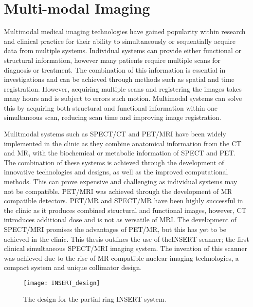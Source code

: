 \section{Multi-modal Imaging} %
Multimodal medical imaging technologies have gained popularity within research and clinical practice for their ability to simultaneously or sequentially acquire data from multiple systems. Individual systems can provide either functional or structural information, however many patients require multiple scans for diagnosis or treatment. The combination of this information is essential in investigations and can be achieved through methods such as spatial and time registration. However, acquiring multiple scans and registering the images takes many hours and is subject to errors such motion. Multimodal systems can solve this by acquiring both structural and functional information within one simultaneous scan, reducing scan time and improving image registration. 

Mulitmodal systems such as \acrlong{SPECT/CT} and \acrlong{PET/MRI} have been widely implemented in the clinic as they combine anatomical information from the \acrshort{CT} and \acrshort{MR}, with the biochemical or metabolic information of \acrshort{SPECT} and \acrshort{PET}. The combination of these systems is achieved through the development of innovative technologies and designs, as well as the improved computational methods. This can prove expensive and challenging as individual systems may not be compatible. \acrshort{PET/MRI} was achieved through the development of \acrshort{MR} compatible detectors. \acrshort{PET/MR} and \acrshort{SPECT/MR} have been highly successful in the clinic as it produces combined structural and functional images, however, \acrshort{CT} introduces additional dose and is not as versatile of \acrshort{MRI}. The development of \acrshort{SPECT/MRI} promises the advantages of \acrshort{PET/MR}, but this has yet to be achieved in the clinic. This thesis outlines the use of the\acrshort{INSERT} scanner; the first clinical simultaneous \acrshort{SPECT/MRI} imaging system. The invention of this scanner was achieved due to the rise of \acrshort{MR} compatible nuclear imaging technologies, a compact system and unique collimator design. 

\begin{figure}[htp]
    \centering
    \texttt{[image: INSERT\_design]} %
    \caption{The design for the partial ring INSERT system.} \label{fig:INSERT}
\end{figure}


